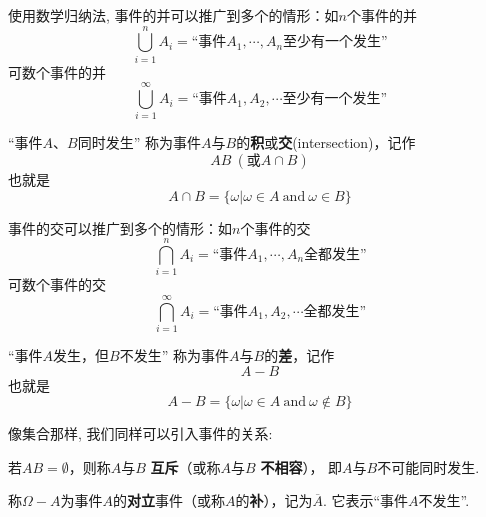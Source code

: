 \begin{remark}
    使用数学归纳法, 事件的并可以推广到多个的情形：如$n$个事件的并
    $$\bigcup_{i=1}^{n} A_i =\text{“事件$A_1, \cdots, A_n$至少有一个发生”}$$
    可数个事件的并
    $$\bigcup_{i=1}^{\infty} A_i =\text{“事件$A_1, A_2, \cdots$至少有一个发生”}$$
\end{remark}

\begin{definition}
    “事件$A$、$B$同时发生”
    称为事件$A$与$B$的\textbf{积}或\textbf{交}(intersection)，记作
    $$AB \ (\text{或}A\cap B)$$
    也就是$$A\cap B=\{\omega | \omega\in A \ \text{and}\ \omega\in B\}$$
\end{definition}

\begin{remark}
    事件的交可以推广到多个的情形：如$n$个事件的交
    $$\bigcap_{i=1}^{n} A_i =\text{“事件$A_1, \cdots, A_n$全都发生”}$$
    可数个事件的交
    $$\bigcap_{i=1}^{\infty} A_i =\text{“事件$A_1, A_2, \cdots$全都发生”}$$
\end{remark}

\begin{definition}
    “事件$A$发生，但$B$不发生”
    称为事件$A$与$B$的\textbf{差}，记作
    $$A-B$$
    也就是
    $$A- B=\{\omega | \omega\in A \ \text{and}\ \omega\notin B\}$$
\end{definition}

像集合那样, 我们同样可以引入事件的关系:

\begin{definition}
    若$AB=\emptyset$，则称$A$与$B$ \textbf{互斥}（或称$A$与$B$ \textbf{不相容}），%
    即$A$与$B$不可能同时发生.
\end{definition}

\begin{definition}
    称$\Omega-A$为事件$A$的\textbf{对立}事件（或称$A$的\textbf{补}），记为$\overline{A}$.
    它表示“事件$A$不发生”.
\end{definition}


